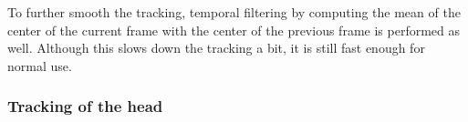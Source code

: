 To further smooth the tracking, temporal filtering by computing the mean of the center of the current frame with the center of the previous frame is performed as well. 
Although this slows down the tracking a bit, it is still fast enough for normal use.

\subsubsection{Tracking of the head}

